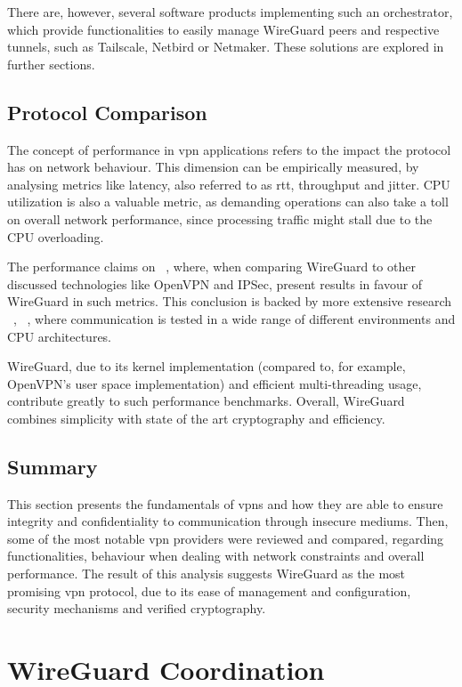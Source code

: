 \documentclass[11pt,twoside,a4paper]{report}
\begin{document}
There are, however, several software products implementing such an orchestrator, which provide functionalities to easily manage WireGuard peers and respective tunnels, such as Tailscale, Netbird or Netmaker. These solutions are explored in further sections.


\subsection{Protocol Comparison}

The concept of performance in \ac{vpn} applications refers to the impact the protocol has on network behaviour. This dimension can be empirically measured, by analysing metrics like latency, also referred to as \ac{rtt}, throughput and jitter. CPU utilization is also a valuable metric, as demanding operations can also take a toll on overall network performance, since processing traffic might stall due to the CPU overloading.

The performance claims on ~\cite{donenfeld2017wireguard}, where, when comparing WireGuard to other discussed technologies like OpenVPN and IPSec, present results in favour of WireGuard in such metrics. This conclusion is backed by more extensive research ~\cite{mackey2020performance}, ~\cite{osswald2020performance}, where communication is tested in a wide range of different environments and CPU architectures.

WireGuard, due to its kernel implementation (compared to, for example, OpenVPN's user space implementation) and efficient multi-threading usage, contribute greatly to such performance benchmarks. Overall, WireGuard combines simplicity with state of the art cryptography and efficiency.

\subsection{Summary}

This section presents the fundamentals of \acp{vpn} and how they are able to ensure integrity and confidentiality to communication through insecure mediums. Then, some of the most notable \ac{vpn} providers were reviewed and compared, regarding functionalities, behaviour when dealing with network constraints and overall performance. The result of this analysis suggests WireGuard as the most promising \ac{vpn} protocol, due to its ease of management and configuration, security mechanisms and verified cryptography.


\section{WireGuard Coordination}
\label{sec:coordination}
\end{document}
